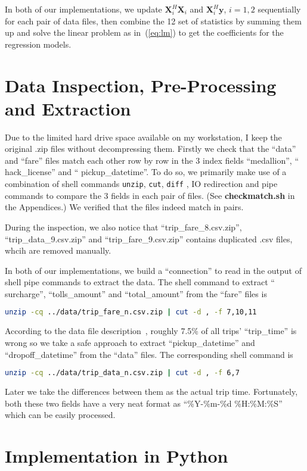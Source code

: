 \documentclass{article}
\begin{document}
In both of our implementations,  we update $\mathbf{X}_i^H\mathbf{X}_i$ and
$\mathbf{X}_i^H\mathbf{y}$, $i=1,2$ sequentially for each pair of data files,
then combine the 12 set of statistics by summing them up and solve the linear
problem as in~(\ref{eq:lm}) to get the coefficients for the regression models.

\section{Data Inspection, Pre-Processing and Extraction}
Due to the limited hard drive space available on my workstation, I keep the
original .zip files without decompressing them. Firstly we check that the
``data'' and ``fare'' files match each other row by row in the 3 index
fields ``medallion'', `` hack\_license'' and `` pickup\_datetime''. To do so, we
primarily make use of a combination of shell commands \texttt{unzip},
\texttt{cut}, \texttt{diff} , IO redirection and pipe commands to compare the 3
fields in each pair of files. (See \textbf{checkmatch.sh} in the Appendices.) We
verified that the files indeed match in pairs.

During the inspection, we also notice that ``trip\_fare\_8.csv.zip'',
``trip\_data\_9.csv.zip'' and ``trip\_fare\_9.csv.zip'' contains duplicated .csv
files, whcih are removed manually.

In both of our implementations, we build a ``connection'' to read in the output
of shell pipe commands to extract the data. The shell command to extract
`` surcharge'', ``tolls\_amount'' and ``total\_amount'' from the ``fare'' files
is
\begin{lstlisting}[language=sh]
    unzip -cq ../data/trip_fare_n.csv.zip | cut -d , -f 7,10,11
\end{lstlisting}

According to the data file description~\cite{}, roughly 7.5\% of all
trips' ``trip\_time'' is wrong so we take a safe approach to extract
``pickup\_datetime'' and ``dropoff\_datetime'' from the ``data'' files. The
corresponding shell command is
\begin{lstlisting}[language=sh]
    unzip -cq ../data/trip_data_n.csv.zip | cut -d , -f 6,7
\end{lstlisting}

Later we take the differences between them as the actual trip time. Fortunately,
both these two fields have a very neat format as ``\%Y-\%m-\%d \%H:\%M:\%S''
which can be easily processed.
\section{Implementation in Python}
\end{document}
